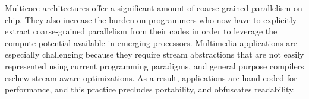\vspace{-6pt}
\vspace{-11pt}

Multicore architectures offer a significant amount of coarse-grained
parallelism on chip. They also increase the burden on programmers who
now have to explicitly extract coarse-grained parallelism from their
codes in order to leverage the compute potential available in emerging
processors. Multimedia applications are especially challenging because
they require stream abstractions that are not easily represented using
current programming paradigms, and general purpose compilers eschew
stream-aware optimizations. As a result, applications are hand-coded
for performance, and this practice precludes portability, and
obfuscates readability. 




